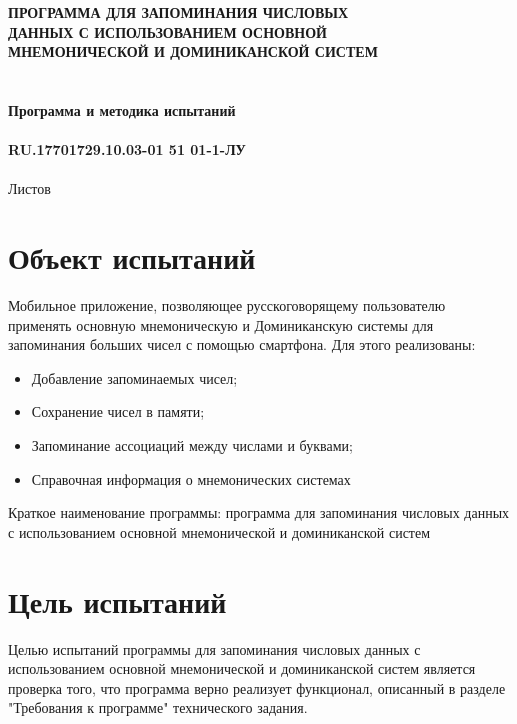 \documentclass[draft]{article}
\begin{document}
\bigskip
\begin{center}
\topskip=0pt
\vspace*{\fill}
\textbf{ПРОГРАММА ДЛЯ ЗАПОМИНАНИЯ ЧИСЛОВЫХ\\
 ДАННЫХ С ИСПОЛЬЗОВАНИЕМ ОСНОВНОЙ\\
 МНЕМОНИЧЕСКОЙ И ДОМИНИКАНСКОЙ СИСТЕМ\\
~\\
~\\
Программа и методика испытаний\\
~\\
RU.17701729.10.03-01 51 01-1-ЛУ}\\
~\\
Листов \ztotpages\\
\vspace*{\fill}
\end{center}
\begin{center}
\end{center}
\newpage
\begin{center}
\tableofcontents
\end{center}
\newpage
\section {Объект испытаний}
Мобильное приложение, позволяющее русскоговорящему пользователю применять основную мнемоническую и Доминиканскую системы для запоминания больших чисел с помощью смартфона. Для этого реализованы:
\begin{itemize}
    \item Добавление запоминаемых чисел;
    \item Сохранение чисел в памяти;
    \item Запоминание ассоциаций между числами и буквами;
    \item Справочная информация о мнемонических системах
\end{itemize}
Краткое наименование программы: программа для запоминания числовых данных с использованием основной мнемонической и доминиканской систем\\
\newpage
\section {Цель испытаний}
Целью испытаний программы для запоминания числовых данных с использованием основной мнемонической и доминиканской систем является проверка того, что программа верно реализует функционал, описанный в разделе "{}Требования к программе"{} технического задания.
\newpage
\end{document}
